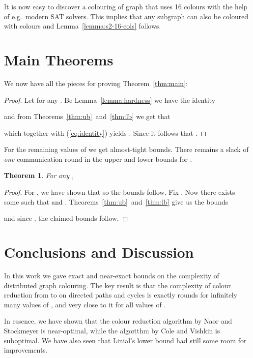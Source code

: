 \documentclass[a4paper,11pt]{article}
\newtheorem{theorem}{Theorem}
\theoremstyle{remark}
\begin{document}
It is now easy to discover a colouring of graph  that uses 16 colours with the help of e.g.\ modern SAT solvers. This implies that any subgraph  can also be coloured with  colours and Lemma~\ref{lemma:s2-16-cols} follows.

\section{Main Theorems}

We now have all the pieces for proving Theorem~\ref{thm:main}:

\mainthm* 
\begin{proof}
Let  for any . Be Lemma~\ref{lemma:hardness} we have the identity

and from Theorems~\ref{thm:ub}~and~\ref{thm:lb} we get that

which together with (\ref{eq:identity}) yields . Since  it follows that .
\end{proof}

For the remaining values of  we get almost-tight bounds. There remains a slack of \emph{one} communication round in the upper and lower bounds for .

\begin{theorem}
 For any , 
 
\end{theorem}
\begin{proof}
 For , we have shown that  so the bounds follow. Fix . Now there exists some  such that  and . Theorems~\ref{thm:ub}~and~\ref{thm:lb} give us the bounds

and since , the claimed bounds follow.
\end{proof} 


\section{Conclusions and Discussion}

In this work we gave exact and near-exact bounds on the complexity of distributed graph colouring. The key result is that the complexity of colour reduction from  to  on directed paths and cycles is exactly  rounds for infinitely many values of , and very close to it for all values of .

In essence, we have shown that the colour reduction algorithm by Naor and Stockmeyer is near-optimal, while the algorithm by Cole and Vishkin is suboptimal. We have also seen that Linial's lower bound had still some room for improvements.
\end{document}
